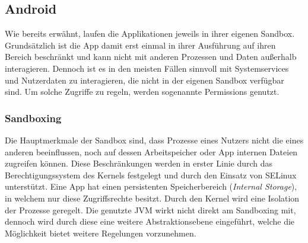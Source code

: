 \subsection{Android}
 \label{sec:SandBoxingNPermissions}
	Wie bereits erwähnt, laufen die Applikationen jeweils in ihrer eigenen Sandbox. Grundsätzlich ist die App damit erst einmal in ihrer Ausführung auf ihren Bereich beschränkt und kann nicht mit anderen Prozessen und Daten außerhalb interagieren. Dennoch ist es in den meisten Fällen sinnvoll mit Systemservices und Nutzerdaten zu interagieren, die nicht in der eigenen Sandbox verfügbar sind. Um solche Zugriffe zu regeln, werden sogenannte Permissions genutzt.
	
	\subsubsection{Sandboxing}
	Die Hauptmerkmale der Sandbox sind, dass Prozesse eines Nutzers nicht die eines
	anderen beeinflussen, noch auf dessen Arbeitspeicher oder App internen Dateien
	zugreifen können. Diese Beschränkungen werden in erster Linie durch das
	Berechtigungssystem des Kernels festgelegt und durch den Einsatz von SELinux
	unterstützt. Eine App hat einen persistenten Speicherbereich (\textit{Internal
	Storage}), in welchem nur diese Zugriffsrechte besitzt. Durch den Kernel wird
	eine Isolation der Prozesse geregelt. Die genutzte JVM wirkt nicht direkt am
	Sandboxing mit, dennoch wird durch diese eine weitere Abstraktionsebene
	eingeführt, welche die Möglichkeit bietet weitere Regelungen vorzunehmen. %
	
